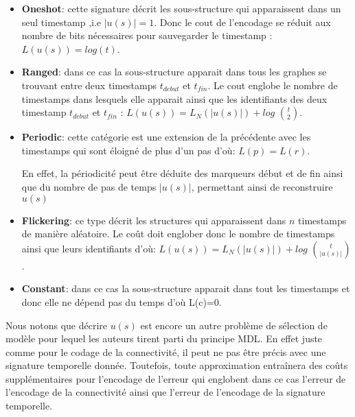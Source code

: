 			 
			 \begin{itemize}[label=$\circ$]
			 \item \textbf{Oneshot}: cette signature décrit les sous-structure qui apparaissent dans un seul timestamp ,i.e $|u(s)|=1$. Donc le cout de l'encodage se réduit aux nombre de bits nécessaires pour sauvegarder le timestamp : $L(u(s)) = log(t)$.
			 \item \textbf{Ranged}: dans ce cas la sous-structure apparait dans tous les graphes se trouvant entre deux timestamps $t_{debut}$ et $t_{fin}$. Le cout englobe le nombre de timestamps dans lesquels elle apparait ainsi que les identifiants des deux timestamp $t_{debut}$ et $t_{fin}$ : $L(u(s)) = L_{N}(|u(s)|) +log$ ${t}\choose{2}$.
			 \item \textbf{Periodic}: cette catégorie est une extension   de la précédente avec les timestamps qui sont éloigné de plus d'un pas d'où: $L(p) = L(r)$.
			 
			 En effet, la périodicité peut être déduite des marqueurs début et de fin ainsi que du nombre de pas de temps $|u(s)|$, permettant ainsi de reconstruire $u(s)$
			 \item \textbf{Flickering}: ce type décrit les structures qui apparaissent dans $n$ timestamps de manière aléatoire. Le coût doit englober donc le nombre de timestamps ainsi que leurs identifiants d'où: 
			 $L(u(s)) = L_{N}(|u(s)|) +log$ ${t}\choose{|u(s)|}$.
			 \item \textbf{Constant}: dans ce cas la sous-structure apparait dans tout les timestamps et donc elle ne dépend pas du temps d'où L(c)=0.
			 \end{itemize} \label{par:TimeCrunch}
			 
			 
			 Nous notons que décrire $u(s)$ est encore un autre problème de sélection de modèle pour lequel les auteurs tirent parti du principe MDL. En effet juste comme pour le codage de la connectivité, il peut ne pas être précis avec une signature temporelle donnée. Toutefois, toute approximation entraînera des coûts supplémentaires pour l'encodage de l'erreur qui englobent dans ce cas l'erreur de l'encodage de la connectivité ainsi que l'erreur de l'encodage de la signature temporelle.
			 

